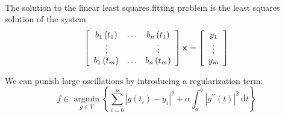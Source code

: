  \\
The solution to the linear least squares fitting problem is the least squares solution of the system
$$
\left[\begin{array}{ccc}
b_{1}\left(t_{1}\right) & \ldots & b_{n}\left(t_{1}\right) \\
\vdots & & \vdots \\
b_{1}\left(t_{m}\right) & \ldots & b_{n}\left(t_{m}\right)
\end{array}\right]
\mathbf{x} = \left[\begin{array}{c}
y_{1} \\
\vdots \\
y_{m}
\end{array}\right]
$$

\Method[Regularization] We can punish large oscillations by introducing a regularization term:
$$
f \in \underset{g \in V}{\operatorname{argmin}}\left\{\sum_{i=0}^{n}\left|g\left(t_{i}\right)-y_{i}\right|^{2}+\alpha \int_{a}^{b}\left|g^{\prime \prime}(t)\right|^{2} \mathrm{~d} t\right\}
$$